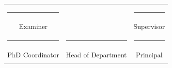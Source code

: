 \begin{center}
{\begin{center}
 \vspace{0.2in}
%
%
%
\begin{tabular}{ccc}

      \rule{4.0cm}{1sp} & \hspace{0.7in}                & \hspace{0.3in} \rule{4.0cm}{1sp} \\ \vspace{0.65in}
       Examiner & \hspace{1in}             & \hspace{0.3in} Supervisor \\
      \rule{4.0cm}{1sp} & \hspace{0.5in} \rule{4.0cm}{1sp}                  &\hspace{0.45in} \rule{4.0cm}{1sp} \\
      PhD Coordinator & \hspace{0.5in} Head of Department                &\hspace{0.65in} Principal \\\\
    \end{tabular}
\end{center}




%
\cleardoublepage

}
\end{center}
